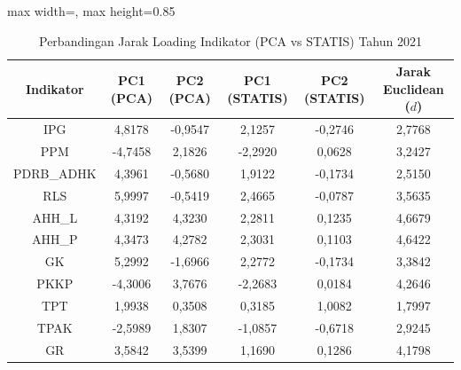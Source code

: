 \begin{table}[H]
\centering
\caption{Perbandingan Jarak Loading Indikator (PCA vs STATIS) Tahun 2021} \label{tab:app1jarak_loading_2021}
\begin{adjustbox}{max width=\textwidth, max height=0.85\textheight}
\begin{tabular}{|c|c|c|c|c|c|}
\hline
\textbf{Indikator} & \textbf{PC1 (PCA)} & \textbf{PC2 (PCA)} & \textbf{PC1 (STATIS)} & \textbf{PC2 (STATIS)} & \textbf{Jarak Euclidean ($d$)} \\
\hline
IPG & 4,8178 & -0,9547 & 2,1257 & -0,2746 & 2,7768 \\
PPM & -4,7458 & 2,1826 & -2,2920 & 0,0628 & 3,2427 \\
PDRB\_ADHK & 4,3961 & -0,5680 & 1,9122 & -0,1734 & 2,5150 \\
RLS & 5,9997 & -0,5419 & 2,4665 & -0,0787 & 3,5635 \\
AHH\_L & 4,3192 & 4,3230 & 2,2811 & 0,1235 & 4,6679 \\
AHH\_P & 4,3473 & 4,2782 & 2,3031 & 0,1103 & 4,6422 \\
GK & 5,2992 & -1,6966 & 2,2772 & -0,1734 & 3,3842 \\
PKKP & -4,3006 & 3,7676 & -2,2683 & 0,0184 & 4,2646 \\
TPT & 1,9938 & 0,3508 & 0,3185 & 1,0082 & 1,7997 \\
TPAK & -2,5989 & 1,8307 & -1,0857 & -0,6718 & 2,9245 \\
GR & 3,5842 & 3,5399 & 1,1690 & 0,1286 & 4,1798 \\
\hline
\end{tabular}
\end{adjustbox}
\end{table}